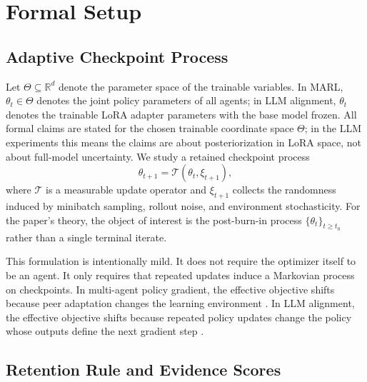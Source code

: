 \documentclass[10pt]{article}
\theoremstyle{plain}
\theoremstyle{definition}
\theoremstyle{remark}
\begin{document}
\section{Formal Setup}

\subsection{Adaptive Checkpoint Process}

Let $\Theta \subseteq \mathbb{R}^d$ denote the parameter space of the trainable variables. In MARL, $\theta_t \in \Theta$ denotes the joint policy parameters of all agents; in LLM alignment, $\theta_t$ denotes the trainable LoRA adapter parameters with the base model frozen. All formal claims are stated for the chosen trainable coordinate space $\Theta$; in the LLM experiments this means the claims are about posteriorization in LoRA space, not about full-model uncertainty. We study a retained checkpoint process
\begin{equation}
\theta_{t+1} = \mathcal{T}(\theta_t,\xi_{t+1}),
\end{equation}
where $\mathcal{T}$ is a measurable update operator and $\xi_{t+1}$ collects the randomness induced by minibatch sampling, rollout noise, and environment stochasticity. For the paper's theory, the object of interest is the post-burn-in process $\{\theta_t\}_{t \geq t_0}$ rather than a single terminal iterate.

This formulation is intentionally mild. It does not require the optimizer itself to be an agent. It only requires that repeated updates induce a Markovian process on checkpoints. In multi-agent policy gradient, the effective objective shifts because peer adaptation changes the learning environment \citep{kim2021meta,giannou2022convergence}. In LLM alignment, the effective objective shifts because repeated policy updates change the policy whose outputs define the next gradient step \citep{rafailov2023dpo,schulman2017ppo,shao2024deepseekmath}.

\subsection{Retention Rule and Evidence Scores}
\end{document}
